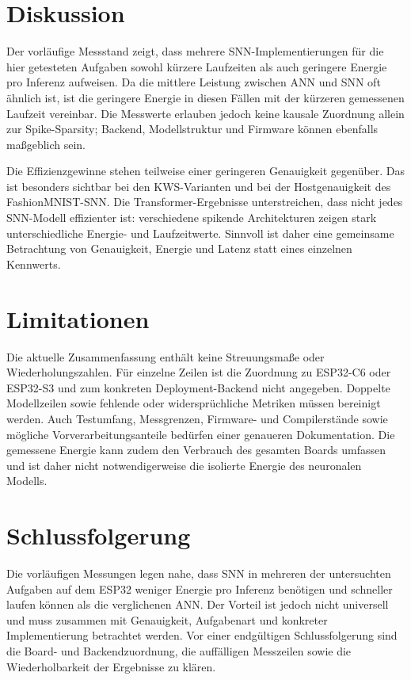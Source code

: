 \documentclass[11pt,a4paper]{article}
\begin{document}
\section{Diskussion}
Der vorläufige Messstand zeigt, dass mehrere SNN-Implementierungen für die hier getesteten Aufgaben sowohl kürzere Laufzeiten als auch geringere Energie pro Inferenz aufweisen. Da die mittlere Leistung zwischen ANN und SNN oft ähnlich ist, ist die geringere Energie in diesen Fällen mit der kürzeren gemessenen Laufzeit vereinbar. Die Messwerte erlauben jedoch keine kausale Zuordnung allein zur Spike-Sparsity; Backend, Modellstruktur und Firmware können ebenfalls maßgeblich sein.

Die Effizienzgewinne stehen teilweise einer geringeren Genauigkeit gegenüber. Das ist besonders sichtbar bei den KWS-Varianten und bei der Hostgenauigkeit des FashionMNIST-SNN. Die Transformer-Ergebnisse unterstreichen, dass nicht jedes SNN-Modell effizienter ist: verschiedene spikende Architekturen zeigen stark unterschiedliche Energie- und Laufzeitwerte. Sinnvoll ist daher eine gemeinsame Betrachtung von Genauigkeit, Energie und Latenz statt eines einzelnen Kennwerts.

\section{Limitationen}
Die aktuelle Zusammenfassung enthält keine Streuungsmaße oder Wiederholungszahlen. Für einzelne Zeilen ist die Zuordnung zu ESP32-C6 oder ESP32-S3 und zum konkreten Deployment-Backend nicht angegeben. Doppelte Modellzeilen sowie fehlende oder widersprüchliche Metriken müssen bereinigt werden. Auch Testumfang, Messgrenzen, Firmware- und Compilerstände sowie mögliche Vorverarbeitungsanteile bedürfen einer genaueren Dokumentation. Die gemessene Energie kann zudem den Verbrauch des gesamten Boards umfassen und ist daher nicht notwendigerweise die isolierte Energie des neuronalen Modells.

\section{Schlussfolgerung}
Die vorläufigen Messungen legen nahe, dass SNN in mehreren der untersuchten Aufgaben auf dem ESP32 weniger Energie pro Inferenz benötigen und schneller laufen können als die verglichenen ANN. Der Vorteil ist jedoch nicht universell und muss zusammen mit Genauigkeit, Aufgabenart und konkreter Implementierung betrachtet werden. Vor einer endgültigen Schlussfolgerung sind die Board- und Backendzuordnung, die auffälligen Messzeilen sowie die Wiederholbarkeit der Ergebnisse zu klären.
\end{document}
